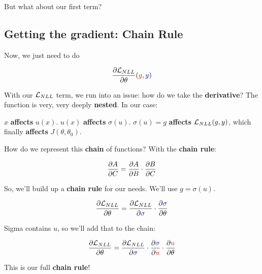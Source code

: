         But what about our first term?
    
    \subsection{Getting the gradient: Chain Rule}
    
        Now, we just need to do
        
        \begin{equation}
            \frac{\partial \mathcal{L}_{NLL}}{\partial \theta} (\textcolor{red}{g} , \textcolor{blue}{y})
        \end{equation}
    
        With our $\mathcal{L}_{NLL}$ term, we run into an issue: how do we take the \textbf{derivative}? The function is very, very deeply \textbf{nested}. In our case: 
        
        $x$ \textbf{affects} $u(x)$. $u(x)$ \textbf{affects} $\sigma(u)$. $\sigma(u)=g$ \textbf{affects} $\mathcal{L}_{NLL}(g,y)$, which finally \textbf{affects} $J(\theta,\theta_0)$. 
        
        How do we represent this \textbf{chain} of functions? With the \textbf{chain rule}:
        
        \begin{equation}
            \frac{\partial A}{\partial C} = \frac{\partial A}{\partial B} \cdot \frac{\partial B}{\partial C}
        \end{equation}
        
        So, we'll build up a \textbf{chain rule} for our needs. We'll use $g=\sigma(u)$.
        
        \begin{equation}
            \frac{\partial  \mathcal{L}_{NLL} }{\partial  \theta } 
            = 
            \frac{\partial  \mathcal{L}_{NLL} }{\partial \textcolor{blue}{\sigma}} 
            \cdot 
            \frac{\partial \textcolor{blue}{\sigma}}{\partial \theta}
        \end{equation}
        
        Sigma contains $u$, so we'll add that to the chain:

        \begin{equation}
            \frac{\partial  \mathcal{L}_{NLL} }{\partial  \theta } 
            = 
            \frac{\partial  \mathcal{L}_{NLL} }{\partial  \textcolor{blue}{\sigma} } 
            \cdot 
            \frac{\partial  \textcolor{blue}{\sigma} }{\partial \textcolor{red}{u}} 
            \cdot 
            \frac{\partial \textcolor{red}{u}}{\partial \theta}
        \end{equation}
        
        This is our full \textbf{chain rule}!\\
        
